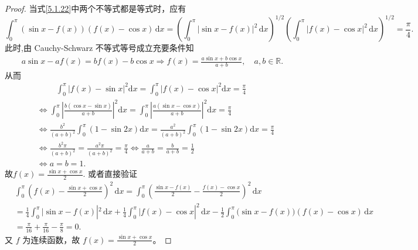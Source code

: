 \documentclass[../../main.tex]{subfiles}
\begin{document}
\begin{proof}
当式\eqref{5.1.22}中两个不等式都是等式时，应有
\[
\int_{0}^{\pi} (\sin x - f(x))(f(x) - \cos x) \, \mathrm{d}x
= \left( \int_{0}^{\pi} |\sin x - f(x)|^2 \, \mathrm{d}x \right)^{1/2} \left( \int_{0}^{\pi} |f(x) - \cos x|^2 \, \mathrm{d}x \right)^{1/2} = \frac{\pi}{4}.
\]
此时,由 Cauchy-Schwarz 不等式等号成立充要条件知
\begin{align*}
a\sin x-af\left( x \right) =bf\left( x \right) -b\cos x\Longrightarrow f\left( x \right) =\frac{a\sin x+b\cos x}{a+b},\quad a,b\in \mathbb{R} .
\end{align*}
从而
\begin{align*}
&\qquad \,\, \int_0^{\pi}{\left| f\left( x \right) -\sin x \right|^2\mathrm{d}x}=\int_0^{\pi}{\left| f\left( x \right) -\cos x \right|^2\mathrm{d}x}=\frac{\pi}{4}
\\
&\Longleftrightarrow \int_0^{\pi}{\left| \frac{b\left( \cos x-\sin x \right)}{a+b} \right|^2\mathrm{d}x}=\int_0^{\pi}{\left| \frac{a\left( \sin x-\cos x \right)}{a+b} \right|^2\mathrm{d}x}=\frac{\pi}{4}
\\
&\Longleftrightarrow \frac{b^2}{\left( a+b \right) ^2}\int_0^{\pi}{\left( 1-\sin 2x \right) \mathrm{d}x}=\frac{a^2}{\left( a+b \right) ^2}\int_0^{\pi}{\left( 1-\sin 2x \right) \mathrm{d}x}=\frac{\pi}{4}
\\
&\Longleftrightarrow \frac{b^2\pi}{\left( a+b \right) ^2}=\frac{a^2\pi}{\left( a+b \right) ^2}=\frac{\pi}{4}\Longleftrightarrow \frac{a}{a+b}=\frac{b}{a+b}=\frac{1}{2}
\\
&\Longleftrightarrow a=b=1.
\end{align*}
故$f\left( x \right) =\frac{\sin x+\cos x}{2}.$
或者直接验证
\begin{align*}
&\int_0^{\pi}{\left( f(x)-\frac{\sin x+\cos x}{2} \right) ^2\,\mathrm{d}x}=\int_0^{\pi}{\left( \frac{\sin x-f(x)}{2}-\frac{f(x)-\cos x}{2} \right) ^2\,\mathrm{d}x}
\\
&=\frac{1}{4}\int_0^{\pi}{|\sin x}-f(x)|^2\,\mathrm{d}x+\frac{1}{4}\int_0^{\pi}{|f(x)}-\cos x|^2\,\mathrm{d}x
-\frac{1}{2}\int_0^{\pi}{(\sin x}-f(x))(f(x)-\cos x)\,\mathrm{d}x
\\
&=\frac{\pi}{16}+\frac{\pi}{16}-\frac{\pi}{8}=0.
\end{align*}
又 \( f \) 为连续函数，故 \( f(x) = \frac{\sin x + \cos x}{2} \)。

\end{proof}
\end{document}
